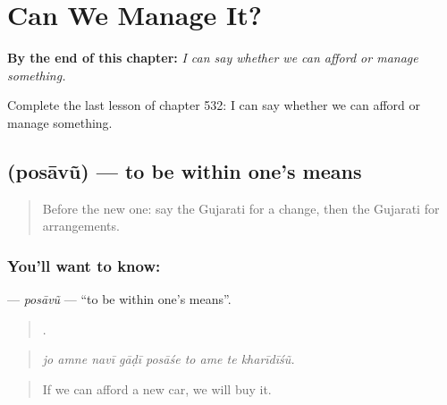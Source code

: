
\chapter{Can We Manage It?}
\label{ch:gu-can-we-manage-it}

\begin{chapteropening}
\textbf{By the end of this chapter:} \emph{I can say whether we can afford or manage something.}

Complete the last lesson of chapter 532: I can say whether we can afford or manage something.
\end{chapteropening}

\section[\texorpdfstring{\gu{પોસાવું} (posāvũ)}{પોસાવું (posāvũ)}]{ (posāvũ) — to be within one's means}

\label{lesson:GU-C532-posavu}



\begin{quote}
Before the new one: say the Gujarati for a change, then the Gujarati for arrangements.
\end{quote}

\subsection*{You'll want to know: }
\textbf{} — \emph{posāvũ} — \textquotedblleft{}to be within one's means\textquotedblright{}.

\begin{quote}
        .
\end{quote}

\begin{quote}
\emph{jo amne navī gāḍī posāśe to ame te kharīdīśũ.}
\end{quote}

\begin{quote}
If we can afford a new car, we will buy it.
\end{quote}


